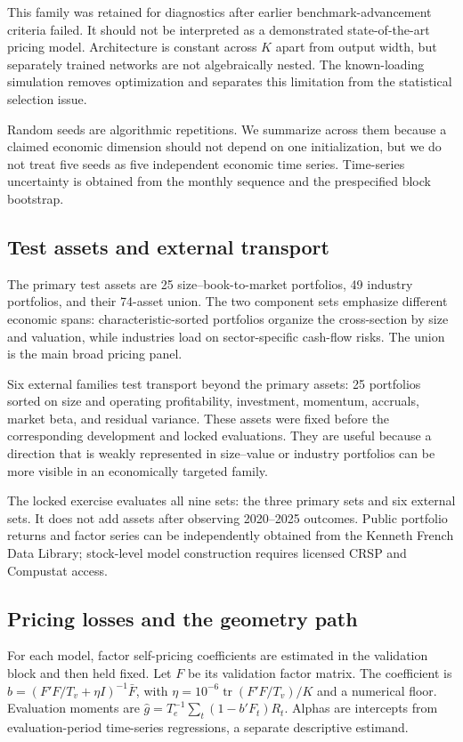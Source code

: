 This family was retained for diagnostics after earlier benchmark-advancement criteria failed. It should not be interpreted as a demonstrated state-of-the-art pricing model. Architecture is constant across $K$ apart from output width, but separately trained networks are not algebraically nested. The known-loading simulation removes optimization and separates this limitation from the statistical selection issue.

Random seeds are algorithmic repetitions. We summarize across them because a claimed economic dimension should not depend on one initialization, but we do not treat five seeds as five independent economic time series. Time-series uncertainty is obtained from the monthly sequence and the prespecified block bootstrap.

\subsection{Test assets and external transport}

The primary test assets are 25 size--book-to-market portfolios, 49 industry portfolios, and their 74-asset union. The two component sets emphasize different economic spans: characteristic-sorted portfolios organize the cross-section by size and valuation, while industries load on sector-specific cash-flow risks. The union is the main broad pricing panel.

Six external families test transport beyond the primary assets: 25 portfolios sorted on size and operating profitability, investment, momentum, accruals, market beta, and residual variance. These assets were fixed before the corresponding development and locked evaluations. They are useful because a direction that is weakly represented in size--value or industry portfolios can be more visible in an economically targeted family.

The locked exercise evaluates all nine sets: the three primary sets and six external sets. It does not add assets after observing 2020--2025 outcomes. Public portfolio returns and factor series can be independently obtained from the Kenneth French Data Library; stock-level model construction requires licensed CRSP and Compustat access.

\subsection{Pricing losses and the geometry path}

For each model, factor self-pricing coefficients are estimated in the validation block and then held fixed. Let $F$ be its validation factor matrix. The coefficient is $b=(F'F/T_v+\eta I)^{-1}\bar F$, with $\eta=10^{-6}\operatorname{tr}(F'F/T_v)/K$ and a numerical floor. Evaluation moments are $\hat g=T_e^{-1}\sum_t(1-b'F_t)R_t$. Alphas are intercepts from evaluation-period time-series regressions, a separate descriptive estimand.

